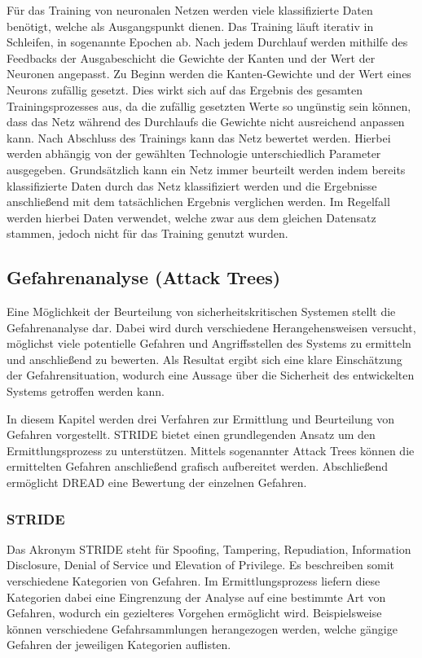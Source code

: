 Für das Training von neuronalen Netzen werden viele klassifizierte Daten benötigt, welche als Ausgangspunkt dienen.
Das Training läuft iterativ in Schleifen, in sogenannte Epochen ab.
Nach jedem Durchlauf werden mithilfe des Feedbacks der Ausgabeschicht die Gewichte der Kanten und der Wert der Neuronen angepasst.
Zu Beginn werden die Kanten-Gewichte und der Wert eines Neurons zufällig gesetzt.
Dies wirkt sich auf das Ergebnis des gesamten Trainingsprozesses aus, da die zufällig gesetzten Werte so ungünstig sein können, dass das Netz während des Durchlaufs die Gewichte nicht ausreichend anpassen kann.
Nach Abschluss des Trainings kann das Netz bewertet werden.
Hierbei werden abhängig von der gewählten Technologie unterschiedlich Parameter ausgegeben.
Grundsätzlich kann ein Netz immer beurteilt werden indem bereits klassifizierte Daten durch das Netz klassifiziert werden und die Ergebnisse anschließend mit dem tatsächlichen Ergebnis verglichen werden.
Im Regelfall werden hierbei Daten verwendet, welche zwar aus dem gleichen Datensatz stammen, jedoch nicht für das Training genutzt wurden.
\autocite[vgl.][]{marcel_mikl_wie_2018}

\subsection{Gefahrenanalyse (Attack Trees)}
Eine Möglichkeit der Beurteilung von sicherheitskritischen Systemen stellt die Gefahrenanalyse dar.
Dabei wird durch verschiedene Herangehensweisen versucht, möglichst viele potentielle Gefahren und Angriffsstellen des Systems zu ermitteln und anschließend zu bewerten.
Als Resultat ergibt sich eine klare Einschätzung der Gefahrensituation, wodurch eine Aussage über die Sicherheit des entwickelten Systems getroffen werden kann.

In diesem Kapitel werden drei Verfahren zur Ermittlung und Beurteilung von Gefahren vorgestellt.
STRIDE bietet einen grundlegenden Ansatz um den Ermittlungsprozess zu unterstützen.
Mittels sogenannter Attack Trees können die ermittelten Gefahren anschließend grafisch aufbereitet werden.
Abschließend ermöglicht DREAD eine Bewertung der einzelnen Gefahren.

\subsubsection{STRIDE}
Das Akronym STRIDE steht für Spoofing, Tampering, Repudiation, Information Disclosure, Denial of Service und Elevation of Privilege.
Es beschreiben somit verschiedene Kategorien von Gefahren.
Im Ermittlungsprozess liefern diese Kategorien dabei eine Eingrenzung der Analyse auf eine bestimmte Art von Gefahren, wodurch ein gezielteres Vorgehen ermöglicht wird.
Beispielsweise können verschiedene Gefahrsammlungen herangezogen werden, welche gängige Gefahren der jeweiligen Kategorien auflisten.

